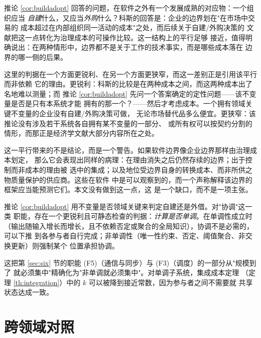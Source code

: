 \begin{remark}\label{rmk:coase}
推论 \ref{cor:buildadopt} 回答的问题，在软件之外有一个发展成熟的对应物：一个组织应当
\emph{自建}什么，又应当\emph{外购}什么？科斯的回答是：企业的边界划在"在市场中交易的
成本超过在内部组织同一活动的成本"之处\cite{coase1937}，而后续关于自建/外购决策的
文献把这一点转化为治理成本的可操作比较\cite{williamson1985}。这一结构上的平行足够
接近，值得明确说出：在两种情形中，边界都不是关于工作的技术事实，而是哪些成本落在
边界的哪一侧的后果。

这里的判据在一个方面更锐利、在另一个方面更狭窄，而这一差别正是引用该平行而非依赖
它的理由。更锐利：科斯的比较是在两种成本之间，而这两种成本出了名地难以测量；而
推论 \ref{cor:buildadopt} 先问一个答案确定的定性问题——该不变量是否是只有本系统才能
拥有的那一个？——然后才考虑成本。一个拥有领域关键不变量的企业没有自建/外购决策可做，
无论市场替代品多么便宜。更狭窄：该推论没有涉及若干系统各自拥有某不变量的一部分、
或所有权可以按契约分割的情形，而那正是经济学文献大部分内容所在之处。

这一平行带来的不是结论，而是一个警告。如果软件边界像企业边界那样由治理成本划定，
那么它会表现出同样的病理：在理由消失之后仍然存续的边界；出于控制而非成本的理由被
选中的集成；以及地位受边界自身的转换成本、而非所供之物质量保护的供应商。这些在软件
中是可以观察到的，而一个声称解释该边界的框架应当能预测它们。本文没有做到这一点，这
是一个缺口，而不是一项主张。
\end{remark}

\begin{remark}\label{rmk:calm}
推论 \ref{cor:buildadopt} 用不变量是否领域关键来判定自建还是外借。对"协调"这一类
职能，存在一个更锐利且可静态检查的判据：\emph{计算是否单调}。在单调性成立时\cite{calm2011}
（输出随输入增长而增长，且不依赖否定或聚合的全局知识），协调不是必需的，可以下推
到各参与者自行完成；非单调性（唯一性约束、否定、阈值聚合、非交换更新）则强制某个
位置承担协调。

这把第 \ref{sec:six} 节的职能 (F5)（通信与同步）与 (F3)（调度）的一部分从"规模到了
就必须集中"精确化为"非单调就必须集中"。对单调子系统，集成成本定理
（定理 \ref{th:integration}）中的 $k$ 可以被降到接近常数，因为参与者之间不需要就
共享状态达成一致。
\end{remark}

\section{跨领域对照}\label{sec:instances}

